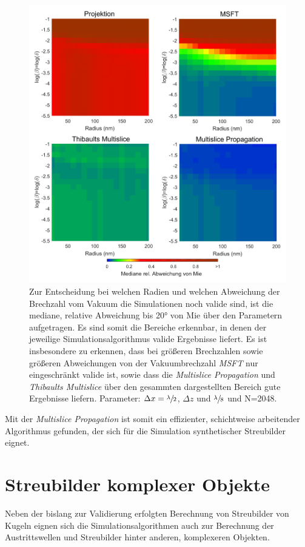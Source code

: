 \begin{figure} %
	\centering
	\includegraphics[width=1\textwidth]{images/fig_sim_var.pdf}
	\caption[Gültigkeit der Simulationsalgorithmen]{Zur Entscheidung bei welchen Radien und welchen Abweichung der Brechzahl vom Vakuum die Simulationen noch valide sind, ist die mediane, relative Abweichung bis 20° von Mie über den Parametern aufgetragen. Es sind somit die Bereiche erkennbar, in denen der jeweilige Simulationsalgorithmus valide Ergebnisse liefert. Es ist insbesondere zu erkennen, dass bei größeren Brechzahlen sowie größeren Abweichungen von der Vakuumbrechzahl \textit{MSFT} nur eingeschränkt valide ist, sowie dass die \textit{Multislice Propagation} und \textit{Thibaults Multislice} über den gesammten dargestellten Bereich gute Ergebnisse liefern. Parameter: $\Delta x=\sfrac{\lambda}{2}$, $\Delta z$ und $\sfrac{\lambda}{8}$ und N=2048.}
	\label{fig:variation}
\end{figure}

Mit der \textit{Multislice Propagation} ist somit ein effizienter, schichtweise arbeitender Algorithmus gefunden, der sich für die Simulation synthetischer Streubilder eignet.


\section{Streubilder komplexer Objekte}
Neben der bislang zur Validierung erfolgten Berechnung von Streubilder von Kugeln eignen sich die Simulationsalgorithmen auch zur Berechnung der Austrittswellen und Streubilder hinter anderen, komplexeren Objekten.

